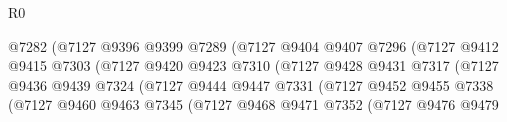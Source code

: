 \begin{lexlean}{R0}
\begin{coremodule}
                                          @7282
                                          (@7127
                                            @9396
                                            @9399
                                            @7289
                                            (@7127
                                              @9404
                                              @9407
                                              @7296
                                              (@7127
                                                @9412
                                                @9415
                                                @7303
                                                (@7127
                                                  @9420
                                                  @9423
                                                  @7310
                                                  (@7127
                                                    @9428
                                                    @9431
                                                    @7317
                                                    (@7127
                                                      @9436
                                                      @9439
                                                      @7324
                                                      (@7127
                                                        @9444
                                                        @9447
                                                        @7331
                                                        (@7127
                                                          @9452
                                                          @9455
                                                          @7338
                                                          (@7127
                                                            @9460
                                                            @9463
                                                            @7345
                                                            (@7127
                                                              @9468
                                                              @9471
                                                              @7352
                                                              (@7127
                                                                @9476
                                                                @9479

\end{coremodule}
\end{lexlean}
